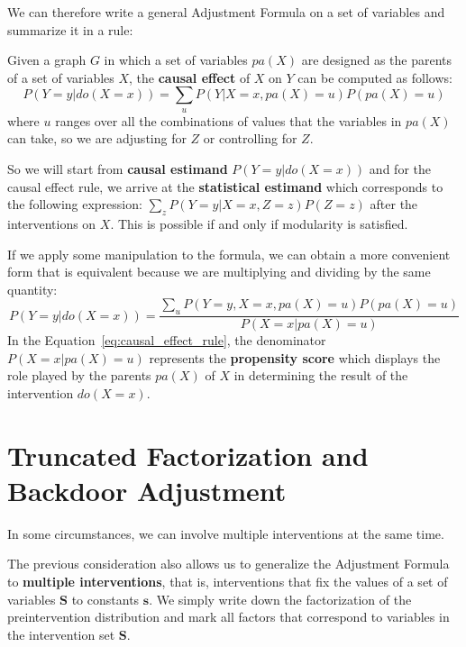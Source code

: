 We can therefore write a general Adjustment Formula on a set of variables and
summarize it in a rule:
\begin{definition}
      Given a graph $G$ in which a set of variables $pa(X)$ are designed as the
      parents of a set of variables $X$, the \textbf{causal effect} of $X$ on
      $Y$ can be computed as follows:
      \begin{equation}
            P(Y = y| do(X = x)) = \sum_{u} P(Y | X = x, pa(X) = u)P(pa(X) = u)
      \end{equation}
      where $u$ ranges over all the combinations of values that the variables in
      $pa(X)$ can take, so we are adjusting for $Z$ or controlling for $Z$.
\end{definition}

So we will start from \textbf{causal estimand} $P(Y = y | do(X = x))$ and for the
causal effect rule, we arrive at the \textbf{statistical estimand} which corresponds
to the following expression: $\sum_z P(Y = y|X = x, Z = z) P(Z = z)$ after
the interventions on $X$. This is possible if and only if modularity is satisfied.

If we apply some manipulation to the formula, we can obtain a more convenient
form that is equivalent because we are multiplying and dividing by the same quantity:
\begin{equation}\label{eq:causal_effect_rule}
      P(Y = y| do(X = x)) = \frac{\sum_{u} P(Y = y, X = x, pa(X) = u)P(pa(X) = u)}{P(X = x | pa(X) = u)}
\end{equation}
In the Equation~\ref{eq:causal_effect_rule}, the denominator $P(X = x | pa(X) = u)$
represents the \textbf{propensity score} which displays the role played by the
parents $pa(X)$ of $X$ in determining the result of the intervention $do(X = x)$.

\section{Truncated Factorization and Backdoor Adjustment}
In some circumstances, we can involve multiple interventions at the same time.

The previous consideration also allows us to generalize the Adjustment Formula to
\textbf{multiple interventions}, that is, interventions that fix the values of a
set of variables $\mathbf{S}$ to constants $\mathbf{s}$. We simply write down the
factorization of the preintervention distribution and mark all factors that
correspond to variables in the intervention set $\mathbf{S}$.

